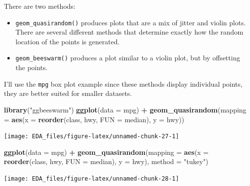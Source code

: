 \documentclass[]{book}
\newenvironment{Shaded}{\begin{snugshade}}{\end{snugshade}}
\newcommand{\DataTypeTok}[1]{\textcolor[rgb]{0.13,0.29,0.53}{#1}}
\newcommand{\KeywordTok}[1]{\textcolor[rgb]{0.13,0.29,0.53}{\textbf{#1}}}
\newcommand{\NormalTok}[1]{#1}
\newcommand{\OperatorTok}[1]{\textcolor[rgb]{0.81,0.36,0.00}{\textbf{#1}}}
\newcommand{\StringTok}[1]{\textcolor[rgb]{0.31,0.60,0.02}{#1}}
\providecommand{\tightlist}{%
  \setlength{\itemsep}{0pt}\setlength{\parskip}{0pt}}
\theoremstyle{plain}
\theoremstyle{remark}
\begin{document}
There are two methods:

\begin{itemize}
\tightlist
\item
  \texttt{geom\_quasirandom()} produces plots that are a mix of jitter and violin plots. There are several different methods that determine exactly how the random location of the points is generated.
\item
  \texttt{geom\_beeswarm()} produces a plot similar to a violin plot, but by offsetting the points.
\end{itemize}

I'll use the \texttt{mpg} box plot example since these methods display individual points, they are better suited for smaller datasets.

\begin{Shaded}
\begin{Highlighting}[]
\KeywordTok{library}\NormalTok{(}\StringTok{"ggbeeswarm"}\NormalTok{)}
\KeywordTok{ggplot}\NormalTok{(}\DataTypeTok{data =}\NormalTok{ mpg) }\OperatorTok{+}
\StringTok{  }\KeywordTok{geom_quasirandom}\NormalTok{(}\DataTypeTok{mapping =} \KeywordTok{aes}\NormalTok{(}\DataTypeTok{x =} \KeywordTok{reorder}\NormalTok{(class, hwy, }\DataTypeTok{FUN =}\NormalTok{ median),}
                                 \DataTypeTok{y =}\NormalTok{ hwy))}
\end{Highlighting}
\end{Shaded}

\begin{center}\texttt{[image: EDA\_files/figure-latex/unnamed-chunk-27-1]} \end{center}

\begin{Shaded}
\begin{Highlighting}[]
\KeywordTok{ggplot}\NormalTok{(}\DataTypeTok{data =}\NormalTok{ mpg) }\OperatorTok{+}
\StringTok{  }\KeywordTok{geom_quasirandom}\NormalTok{(}\DataTypeTok{mapping =} \KeywordTok{aes}\NormalTok{(}\DataTypeTok{x =} \KeywordTok{reorder}\NormalTok{(class, hwy, }\DataTypeTok{FUN =}\NormalTok{ median),}
                                 \DataTypeTok{y =}\NormalTok{ hwy),}
                   \DataTypeTok{method =} \StringTok{"tukey"}\NormalTok{)}
\end{Highlighting}
\end{Shaded}

\begin{center}\texttt{[image: EDA\_files/figure-latex/unnamed-chunk-28-1]} \end{center}
\end{document}

